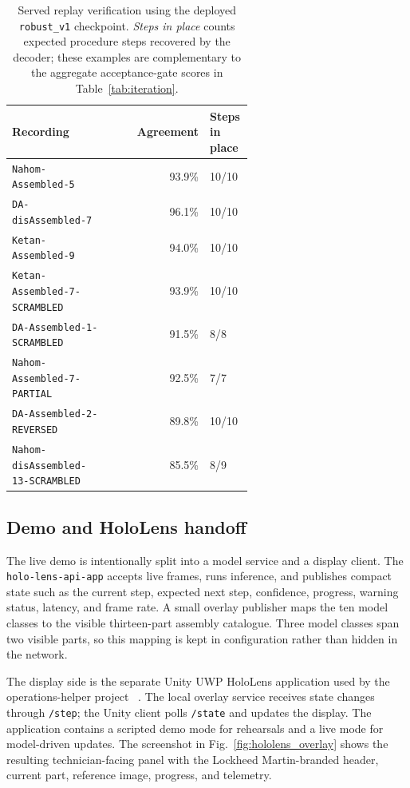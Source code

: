 \documentclass[11pt]{article}
\begin{document}
\begin{table}[H]
\centering
\caption{Served replay verification using the deployed \texttt{robust\_v1} checkpoint. \emph{Steps in place}
counts expected procedure steps recovered by the decoder; these examples are complementary to the aggregate
acceptance-gate scores in Table~\ref{tab:iteration}.}
\label{tab:served_results}
\small
\begin{tabular}{@{}p{0.42\linewidth}rp{0.18\linewidth}@{}}
\toprule
\textbf{Recording} & \textbf{Agreement} & \textbf{Steps in place} \\
\midrule
\texttt{Nahom-Assembled-5} & 93.9\% & 10/10 \\
\texttt{DA-disAssembled-7} & 96.1\% & 10/10 \\
\texttt{Ketan-Assembled-9} & 94.0\% & 10/10 \\
\texttt{Ketan-Assembled-7-SCRAMBLED} & 93.9\% & 10/10 \\
\texttt{DA-Assembled-1-SCRAMBLED} & 91.5\% & 8/8 \\
\texttt{Nahom-Assembled-7-PARTIAL} & 92.5\% & 7/7 \\
\texttt{DA-Assembled-2-REVERSED} & 89.8\% & 10/10 \\
\texttt{Nahom-disAssembled-13-SCRAMBLED} & 85.5\% & 8/9 \\
\bottomrule
\end{tabular}
\end{table}

\subsection{Demo and HoloLens handoff}
\label{sec:demo}

The live demo is intentionally split into a model service and a display client. The
\texttt{holo-lens-api-app} accepts live frames, runs inference, and publishes compact state such as the current
step, expected next step, confidence, progress, warning status, latency, and frame rate. A small overlay publisher
maps the ten model classes to the visible thirteen-part assembly catalogue. Three model classes span two visible
parts, so this mapping is kept in configuration rather than hidden in the network.

The display side is the separate Unity UWP HoloLens application used by the operations-helper project
~\cite{hololensapp}. The local
overlay service receives state changes through \texttt{/step}; the Unity client polls \texttt{/state} and updates
the display. The application contains a scripted demo mode for rehearsals and a live mode for model-driven updates.
The screenshot in Fig.~\ref{fig:hololens_overlay} shows the resulting technician-facing panel with the Lockheed
Martin-branded header, current part, reference image, progress, and telemetry.
\end{document}
